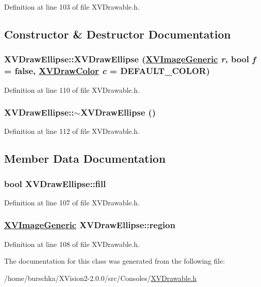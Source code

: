 Definition at line 103 of file XVDrawable.h.

\subsection{Constructor \& Destructor Documentation}
\label{XVDrawEllipse_a0}
\hypertarget{class_XVDrawEllipse_a0}{
\subsubsection[XVDrawEllipse]{\setlength{\rightskip}{0pt plus 5cm}XVDraw\-Ellipse::XVDraw\-Ellipse (\hyperlink{class_XVImageGeneric}{XVImage\-Generic} {\em r}, bool {\em f} = false, \hyperlink{class_XVDrawColor}{XVDraw\-Color} {\em c} = DEFAULT\_\-COLOR)}}




Definition at line 110 of file XVDrawable.h.\label{XVDrawEllipse_a1}
\hypertarget{class_XVDrawEllipse_a1}{
\subsubsection[~XVDrawEllipse]{\setlength{\rightskip}{0pt plus 5cm}XVDraw\-Ellipse::$\sim$XVDraw\-Ellipse ()}}




Definition at line 112 of file XVDrawable.h.

\subsection{Member Data Documentation}
\label{XVDrawEllipse_m0}
\hypertarget{class_XVDrawEllipse_m0}{
\subsubsection[fill]{\setlength{\rightskip}{0pt plus 5cm}bool XVDraw\-Ellipse::fill}}




Definition at line 107 of file XVDrawable.h.\label{XVDrawEllipse_m1}
\hypertarget{class_XVDrawEllipse_m1}{
\subsubsection[region]{\setlength{\rightskip}{0pt plus 5cm}\hyperlink{class_XVImageGeneric}{XVImage\-Generic} XVDraw\-Ellipse::region}}




Definition at line 108 of file XVDrawable.h.

The documentation for this class was generated from the following file:\begin{CompactItemize}
\item 
/home/burschka/XVision2-2.0.0/src/Consoles/\hyperlink{XVDrawable.h-source}{XVDrawable.h}\end{CompactItemize}
